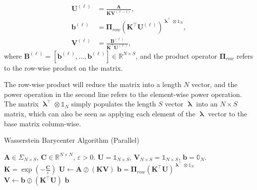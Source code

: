 \begin{update}\label{update:parallel-barycenter}
  \begin{equation}\label{eqn:barycenter-sinkhorn-like-matrix-update}
    \begin{aligned}
      \mathbf{U}^{(\ell)}
       & = \frac{\mathbf{A}}{\mathbf{K} \mathbf{V}^{(\ell-1)}},                                          \\
      \mathbf{b}^{(\ell)}
       & = \boldsymbol{\Pi}_{row}
      \left(\mathbf{K}^\top \mathbf{U}^{(\ell)}\right)^{\boldsymbol\uplambda^\top \otimes \mathbb{1}_N}, \\
      \mathbf{V}^{(\ell)}
       & = \frac{\mathbf{B}^{(\ell)}}{\mathbf{K}^\top \mathbf{U}^{(\ell)}},
    \end{aligned}
  \end{equation}
  where $\mathbf{B}^{(\ell)} = \left[\mathbf{b}^{(\ell)}, \ldots, \mathbf{b}^{(\ell)}\right] \in \mathbb{R}^{N\times S}$,
  and the product operator $\boldsymbol\Pi_{row}$ refers to the row-wise product on the matrix.
\end{update}

The row-wise product will reduce the matrix into a length $N$ vector,
and the power operation in the second line refers to the element-wise power operation.
The matrix $\boldsymbol\uplambda^\top \otimes \mathbb{1}_N$ simply populates the length $S$ vector
$\boldsymbol\uplambda$ into an $N\times S$ matrix,
which can also be seen as applying each element of the $\boldsymbol\uplambda$ vector to the base matrix column-wise.



\begin{algorithm}[H]
  \caption{Wasserstein Barycenter Algorithm (Parallel)}
  \begin{algorithmic}[1]\label{algo:parallel-barycenter}
    \Require $\mathbf{A} \in \Sigma_{N \times S}$, $\mathbf{C} \in \mathbb{R}^{N \times N}$, $\varepsilon > 0$.
    \Initialize $\mathbf{U} = \mathbb{1}_{N \times S}$, $\mathbf{V}_{N \times S} = \mathbb{1}_{N \times S}$,
    $\mathbf{b} = \mathbb{0}_N$.
    \State $\mathbf{K} = \exp(-\frac{\mathbf{C}}{\varepsilon})$
    \State $\mathbf{U} \leftarrow \mathbf{A} \oslash (\mathbf{K} \mathbf{V})$
    \State $\mathbf{b} =
      \boldsymbol\Pi_{row}
      \left(\mathbf{K}^\top \mathbf{U}\right)^{\boldsymbol\uplambda^\top \otimes \mathbb{1}_N}
    $
    \State $\mathbf{V} \leftarrow \mathbf{b} \oslash (\mathbf{K}^\top \mathbf{U})$
    \EndWhile
    \Ensure $\mathbf{b}$
  \end{algorithmic}
\end{algorithm}

